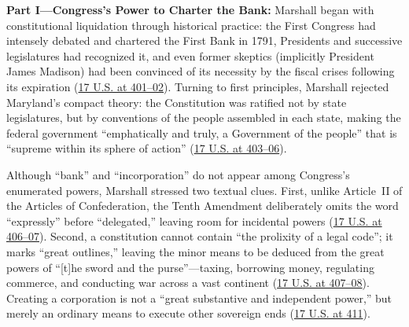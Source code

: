 \documentclass[12pt]{article}
\begin{document}
\textbf{Part I---Congress's Power to Charter the Bank:} Marshall began with constitutional liquidation through historical practice: the First Congress had intensely debated and chartered the First Bank in 1791, Presidents and successive legislatures had recognized it, and even former skeptics (implicitly President James Madison) had been convinced of its necessity by the fiscal crises following its expiration (\href{https://supreme.justia.com/cases/federal/us/17/316/}{17 U.S. at 401--02}). Turning to first principles, Marshall rejected Maryland's compact theory: the Constitution was ratified not by state legislatures, but by conventions of the people assembled in each state, making the federal government ``emphatically and truly, a Government of the people'' that is ``supreme within its sphere of action'' (\href{https://supreme.justia.com/cases/federal/us/17/316/}{17 U.S. at 403--06}).

Although ``bank'' and ``incorporation'' do not appear among Congress's enumerated powers, Marshall stressed two textual clues. First, unlike Article~II of the Articles of Confederation, the Tenth Amendment deliberately omits the word ``expressly'' before ``delegated,'' leaving room for incidental powers (\href{https://supreme.justia.com/cases/federal/us/17/316/}{17 U.S. at 406--07}). Second, a constitution cannot contain ``the prolixity of a legal code''; it marks ``great outlines,'' leaving the minor means to be deduced from the great powers of ``[t]he sword and the purse''---taxing, borrowing money, regulating commerce, and conducting war across a vast continent (\href{https://supreme.justia.com/cases/federal/us/17/316/}{17 U.S. at 407--08}). Creating a corporation is not a ``great substantive and independent power,'' but merely an ordinary means to execute other sovereign ends (\href{https://supreme.justia.com/cases/federal/us/17/316/}{17 U.S. at 411}).
\end{document}
